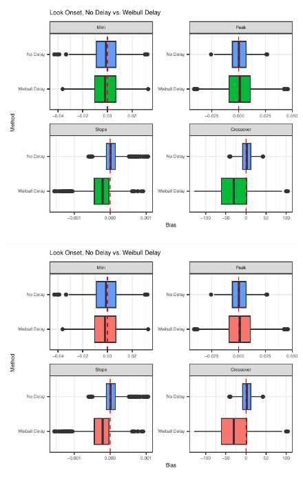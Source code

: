 \documentclass{beamer}
\begin{document}
\begin{frame}
\begin{figure}[H]
\centering
\includegraphics{compare_bar_plot.pdf}
\end{figure}
\end{frame}

\begin{frame}
\begin{figure}[H]
\centering
\includegraphics{compare_bar_plot2.pdf}
\end{figure}
\end{frame}
\end{document}
